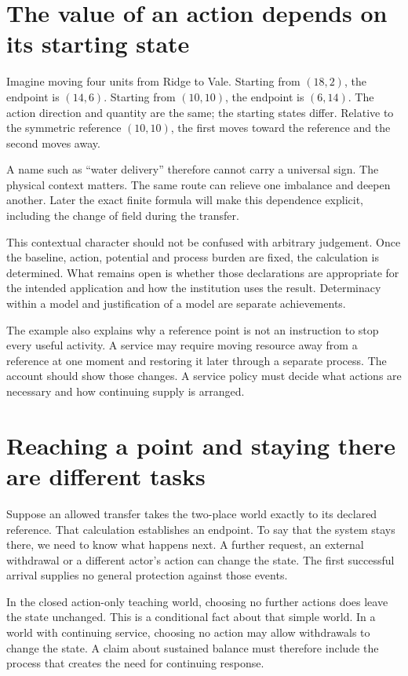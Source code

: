\section{The value of an action depends on its starting state}
Imagine moving four units from Ridge to Vale. Starting from $(18,2)$, the endpoint is $(14,6)$. Starting from $(10,10)$, the endpoint is $(6,14)$. The action direction and quantity are the same; the starting states differ. Relative to the symmetric reference $(10,10)$, the first moves toward the reference and the second moves away.

A name such as ``water delivery'' therefore cannot carry a universal sign. The physical context matters. The same route can relieve one imbalance and deepen another. Later the exact finite formula will make this dependence explicit, including the change of field during the transfer.

This contextual character should not be confused with arbitrary judgement. Once the baseline, action, potential and process burden are fixed, the calculation is determined. What remains open is whether those declarations are appropriate for the intended application and how the institution uses the result. Determinacy within a model and justification of a model are separate achievements.

The example also explains why a reference point is not an instruction to stop every useful activity. A service may require moving resource away from a reference at one moment and restoring it later through a separate process. The account should show those changes. A service policy must decide what actions are necessary and how continuing supply is arranged.

\section{Reaching a point and staying there are different tasks}
Suppose an allowed transfer takes the two-place world exactly to its declared reference. That calculation establishes an endpoint. To say that the system stays there, we need to know what happens next. A further request, an external withdrawal or a different actor's action can change the state. The first successful arrival supplies no general protection against those events.

In the closed action-only teaching world, choosing no further actions does leave the state unchanged. This is a conditional fact about that simple world. In a world with continuing service, choosing no action may allow withdrawals to change the state. A claim about sustained balance must therefore include the process that creates the need for continuing response.

